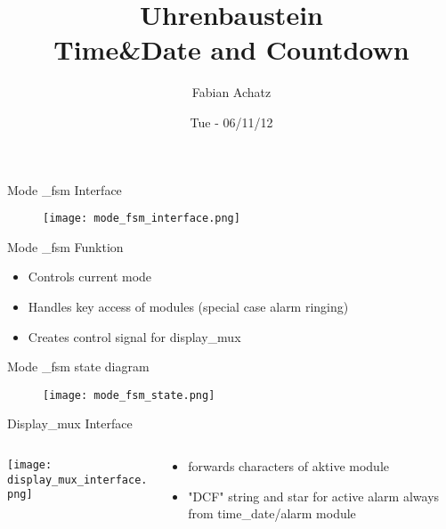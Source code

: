 \documentclass{beamer}
\title[Title of presentation]{Uhrenbaustein\\
{\small Time&Date and Countdown}
}
\author[author name]
{Fabian Achatz}
\institute[Fnord GmbH]{Lehrstuhl f{\"u}r integrierte Systeme}
\date{Tue - 06/11/12}
\begin{document}
%




  \begin{frame}{Mode \_fsm Interface}  
  	\begin{figure}
  		\texttt{[image: mode\_fsm\_interface.png]}
  	\end{figure}
  \end{frame}
  
    \begin{frame}{Mode \_fsm Funktion}  
    	    \begin{itemize}
    	        \item Controls current mode
    	        \item Handles key access of modules (special case alarm ringing)
    	        \item Creates control signal for display\_mux
    	    \end {itemize}
    \end{frame}

  \begin{frame}{Mode \_fsm state diagram}
  	\begin{figure}
    	\texttt{[image: mode\_fsm\_state.png]}
    \end{figure}
  \end{frame}



\begin{frame}{Display\_mux Interface}
    \begin{columns}
    \begin{column}{6cm}
        \texttt{[image: display\_mux\_interface.png]}
    \end{column}
    \begin{column}{6cm}
    \begin{itemize}
        \item forwards characters of aktive module
        \item "DCF" string and star for active alarm always from time\_date/alarm module 
    \end {itemize}
    \end{column}
    \end{columns}
  \end{frame}
\end{document}
